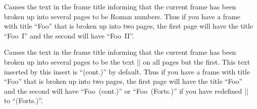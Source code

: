 

\begin{command}{\beamertemplatecontinuationroman}
  Causes the text in the frame title informing that the
  current frame has been broken up into several pages to be Roman
  numbers. Thus if you have a frame with title ``Foo'' that is broken
  up into two pages, the first page will have the title ``Foo~I'' and the
  second will have ``Foo~II''. 
\end{command}

\begin{command}{\beamertemplatecontinuationtext}
  Causes the text in the frame title informing that the
  current frame has been broken up into several pages to be the text
  |\insertcontinuationtext| on all pages but the first. This text
  inserted by this insert is ``(cont.)'' by default. Thus if you have
  a frame with title ``Foo'' that is broken up into two pages, the
  first page will have the title ``Foo'' and the 
  second will have ``Foo~(cont.)'' or ``Foo~(Forts.)'' if you have
  redefined |\insertcontinuationtext| to ``(Forts.)''.
\end{command}







